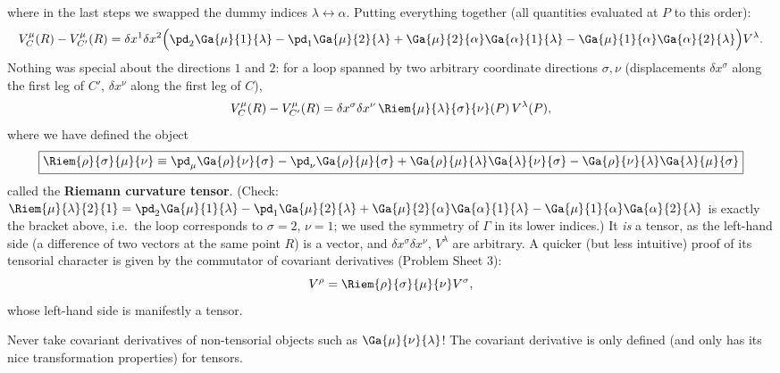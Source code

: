 where in the last steps we swapped the dummy indices $\lambda\leftrightarrow\alpha$. Putting everything together (all quantities evaluated at $P$ to this order):
\begin{equation}
  V_C^\mu(R)-V_{C'}^\mu(R)=\delta x^1\delta x^2\Big(\pd_2\Ga{\mu}{1}{\lambda}-\pd_1\Ga{\mu}{2}{\lambda}+\Ga{\mu}{2}{\alpha}\Ga{\alpha}{1}{\lambda}-\Ga{\mu}{1}{\alpha}\Ga{\alpha}{2}{\lambda}\Big)V^\lambda .
\end{equation}
Nothing was special about the directions $1$ and $2$: for a loop spanned by two arbitrary coordinate directions $\sigma,\nu$ (displacements $\delta x^\sigma$ along the first leg of $C'$, $\delta x^\nu$ along the first leg of $C$),
\begin{equation}
  V_C^\mu(R)-V_{C'}^\mu(R)=\delta x^\sigma\delta x^\nu\,\Riem{\mu}{\lambda}{\sigma}{\nu}(P)\,V^\lambda(P),
\end{equation}
where we have defined the object
\begin{equation}
  \boxed{\Riem{\rho}{\sigma}{\mu}{\nu}\equiv\pd_\mu\Ga{\rho}{\nu}{\sigma}-\pd_\nu\Ga{\rho}{\mu}{\sigma}+\Ga{\rho}{\mu}{\lambda}\Ga{\lambda}{\nu}{\sigma}-\Ga{\rho}{\nu}{\lambda}\Ga{\lambda}{\mu}{\sigma}}
  \label{eq:riemann}
\end{equation}
called the \textbf{Riemann curvature tensor}. (Check: $\Riem{\mu}{\lambda}{2}{1}=\pd_2\Ga{\mu}{1}{\lambda}-\pd_1\Ga{\mu}{2}{\lambda}+\Ga{\mu}{2}{\alpha}\Ga{\alpha}{1}{\lambda}-\Ga{\mu}{1}{\alpha}\Ga{\alpha}{2}{\lambda}$ is exactly the bracket above, i.e.\ the loop corresponds to $\sigma=2$, $\nu=1$; we used the symmetry of $\Gamma$ in its lower indices.) It \emph{is} a tensor, as the left-hand side (a difference of two vectors at the same point $R$) is a vector, and $\delta x^\sigma\delta x^\nu$, $V^\lambda$ are arbitrary. A quicker (but less intuitive) proof of its tensorial character is given by the commutator of covariant derivatives (Problem Sheet 3):
\begin{equation}
  [D_\mu,D_\nu]V^\rho=\Riem{\rho}{\sigma}{\mu}{\nu}V^\sigma ,
  \label{eq:commutator}
\end{equation}
whose left-hand side is manifestly a tensor.

\begin{warningbox}
Never take covariant derivatives of non-tensorial objects such as $\Ga{\mu}{\nu}{\lambda}$! The covariant derivative is only defined (and only has its nice transformation properties) for tensors.
\end{warningbox}

